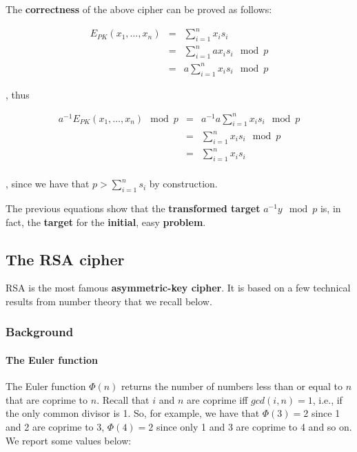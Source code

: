The \textbf{correctness} of the above cipher can be proved as follows:

$$\begin{array}{rcl}E_{PK}(x_1, \ldots, x_n) &=& \sum_{i=1}^{n}{x_i \hat{s_i}}\\ & = & \sum_{i=1}^{n}{a x_i  s_i \mod p}\\& = & a\sum_{i=1}^{n}{x_i  s_i \mod p}\end{array}$$


, thus

$$\begin{array}{rcl}a^{-1}E_{PK}(x_1, \ldots, x_n) \mod p &=& a^{-1} a\sum_{i=1}^{n}{x_i  s_i \mod p}\\ &=& \sum_{i=1}^{n}{x_i  s_i \mod p}\\ &=& \sum_{i=1}^{n}{x_i  s_i}\\\end{array}$$

, since we have that $p > \sum_{i = 1}^n s_i$ by construction. 

The previous equations show that the \textbf{transformed target} $a^{-1} y \mod p$ is, in fact, the \textbf{target} for the \textbf{initial}, easy \textbf{problem}.


\newpage
\subsection{The RSA cipher}
RSA is the most famous \textbf{asymmetric-key cipher}. It is based on a few technical results from number theory that we recall below.

\subsubsection{Background}

\paragraph{The Euler function} The Euler function $\Phi(n)$ returns the number of numbers less than or equal to $n$ that are coprime to $n$. Recall that $i$ and $n$ are coprime iff $gcd(i,n) = 1$, i.e., if the only common divisor is 1. So, for example, we have that $\Phi(3) = 2$ since 1 and 2 are coprime to 3, $\Phi(4) = 2$ since only 1 and 3 are coprime to 4 and so on. We report some values below:

